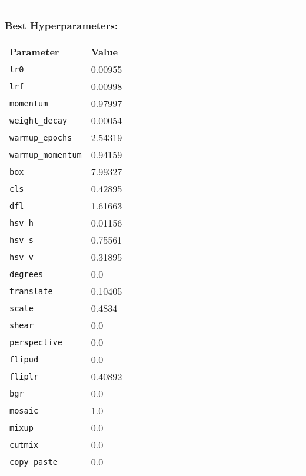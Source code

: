 \documentclass[11pt]{article}
\makeatletter
\newcommand{\boxspacing}{\kern\kvtcb@left@rule\kern\kvtcb@boxsep}
\newcommand{\prompt}[4]{
        {\ttfamily\llap{{\color{#2}[#3]:\hspace{3pt}#4}}\vspace{-\baselineskip}}
    }
\makeatother
\begin{document}
\begin{center}\rule{0.5\linewidth}{0.5pt}\end{center}

\subsubsection{Best Hyperparameters:}\label{best-hyperparameters}

\begin{longtable}[]{@{}ll@{}}
\toprule\noalign{}
Parameter & Value \\
\midrule\noalign{}
\endhead
\bottomrule\noalign{}
\endlastfoot
\texttt{lr0} & 0.00955 \\
\texttt{lrf} & 0.00998 \\
\texttt{momentum} & 0.97997 \\
\texttt{weight\_decay} & 0.00054 \\
\texttt{warmup\_epochs} & 2.54319 \\
\texttt{warmup\_momentum} & 0.94159 \\
\texttt{box} & 7.99327 \\
\texttt{cls} & 0.42895 \\
\texttt{dfl} & 1.61663 \\
\texttt{hsv\_h} & 0.01156 \\
\texttt{hsv\_s} & 0.75561 \\
\texttt{hsv\_v} & 0.31895 \\
\texttt{degrees} & 0.0 \\
\texttt{translate} & 0.10405 \\
\texttt{scale} & 0.4834 \\
\texttt{shear} & 0.0 \\
\texttt{perspective} & 0.0 \\
\texttt{flipud} & 0.0 \\
\texttt{fliplr} & 0.40892 \\
\texttt{bgr} & 0.0 \\
\texttt{mosaic} & 1.0 \\
\texttt{mixup} & 0.0 \\
\texttt{cutmix} & 0.0 \\
\texttt{copy\_paste} & 0.0 \\
\end{longtable}

    \begin{tcolorbox}[breakable, size=fbox, boxrule=1pt, pad at break*=1mm,colback=cellbackground, colframe=cellborder]
\prompt{In}{incolor}{ }{\boxspacing}
\begin{Verbatim}[commandchars=\\\{\}]

\end{Verbatim}
\end{tcolorbox}
\end{document}

